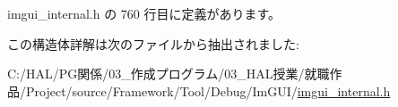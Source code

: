  imgui\+\_\+internal.\+h の 760 行目に定義があります。



この構造体詳解は次のファイルから抽出されました\+:\begin{DoxyCompactItemize}
\item 
C\+:/\+H\+A\+L/\+P\+G関係/03\+\_\+作成プログラム/03\+\_\+\+H\+A\+L授業/就職作品/\+Project/source/\+Framework/\+Tool/\+Debug/\+Im\+G\+U\+I/\mbox{\hyperlink{imgui__internal_8h}{imgui\+\_\+internal.\+h}}\end{DoxyCompactItemize}
